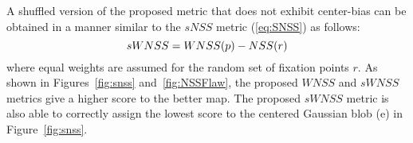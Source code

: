 \documentclass[12pt,onecolumn,journal,	draftclsnofoot]{IEEEtran}
\begin{document}
 A shuffled version of the proposed metric that does not exhibit center-bias can be obtained in a manner similar to the $sNSS$ metric (\ref{eq:SNSS}) as follows: 
\begin{equation}
sWNSS= WNSS(p) - NSS(r) \\
\label{eq:sWNSS}
\end{equation}
where equal weights are assumed for the random set of fixation points $r$.   
As shown in Figures~\ref{fig:snss} and~\ref{fig:NSSFlaw}, the proposed $WNSS$ and $sWNSS$ metrics give a higher score to the better map. The proposed $sWNSS$ metric is also able to correctly assign the lowest score to the centered Gaussian blob (e) in  Figure~\ref{fig:snss}.   
\end{document}
